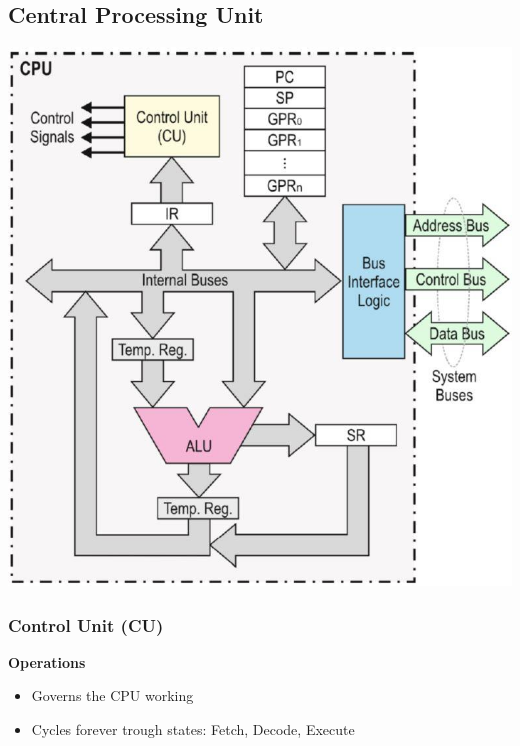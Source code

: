 \begin{multicols}{2}
\subsection{Central Processing Unit}
\includegraphics[width=1.1\linewidth]{images/CPUComponents}

\subsubsection{Control Unit (CU)}
\begin{multicols}{2}
\begin{minipage}{\linewidth}
    \raggedright
    \vspace{-0.5cm}
    \textbf{Operations}   
\begin{itemize}
    \item Governs the CPU working
    \item Cycles forever trough states:
        \subitem Fetch, Decode, Execute
\end{itemize}
\end{minipage}


\end{multicols}
\end{multicols}
